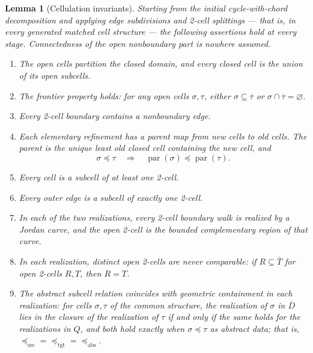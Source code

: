 \documentclass[11pt]{article}
\theoremstyle{mainplain}
\theoremstyle{mainroman}
\newtheorem{longlemma}[theorem]{Lemma}
\theoremstyle{definition}
\newcommand{\romanlabels}{\renewcommand{\labelenumi}{\textup{(\roman{enumi})}}%
  \renewcommand{\theenumi}{\roman{enumi}}}
\numberwithin{equation}{section}
\begin{document}
\begin{longlemma}[Cellulation invariants]\label{lem:cellulation-invariants}
Starting from the initial cycle-with-chord decomposition and applying edge subdivisions and 2-cell splittings --- that is, in every generated matched cell structure --- the following assertions hold at every stage. Connectedness of the open nonboundary part is nowhere assumed.
\begin{enumerate}\romanlabels
\item The open cells partition the closed domain, and every closed cell is the union of its open subcells.
\item The frontier property holds: for any open cells
\(\sigma,\tau\), either \(\sigma\subseteq\overline\tau\) or
\(\sigma\cap\overline\tau=\varnothing\).
\item Every 2-cell boundary contains a nonboundary edge.
\item Each elementary refinement has a parent map from new cells to old cells. The parent is the unique least old closed cell containing the new cell, and
\[
 \sigma\preceq\tau\quad\Longrightarrow\quad
 \operatorname{par}(\sigma)\preceq\operatorname{par}(\tau).
\]
\item Every cell is a subcell of at least one 2-cell.
\item Every outer edge is a subcell of exactly one 2-cell.
\item In each of the two realizations, every 2-cell boundary walk is
      realized by a Jordan curve, and the open 2-cell is the bounded
      complementary region of that curve.
\item In each realization, distinct open 2-cells are never comparable:
      if \(R\subseteq\overline T\) for open 2-cells \(R,T\), then
      \(R=T\).
\item The abstract subcell relation coincides with geometric
      containment in each realization: for cells \(\sigma,\tau\) of
      the common structure, the realization of \(\sigma\) in
      \(\overline D\) lies in the closure of the realization of
      \(\tau\) if and only if the same holds for the realizations in
      \(Q\), and both hold exactly when \(\sigma\preceq\tau\) as
      abstract data; that is,
      \(\preceq_{\mathrm{src}}=\preceq_{\mathrm{tgt}}
       =\preceq_{\mathrm{abs}}\).
\end{enumerate}
\end{longlemma}
\end{document}
